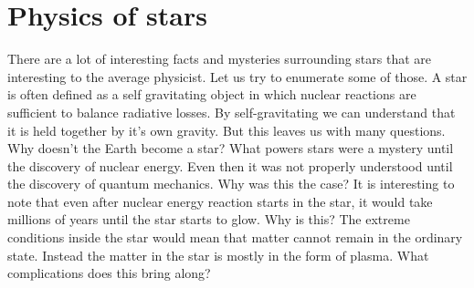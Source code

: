 \documentclass{../template/texnote}
\begin{document}
\section{Physics of stars}
There are a lot of interesting facts and mysteries surrounding stars that are interesting to the average physicist.
Let us try to enumerate some of those.
A star is often defined as a self gravitating object in which nuclear reactions are sufficient to balance radiative losses.
By self-gravitating we can understand that it is held together by it's own gravity.
But this leaves us with many questions. Why doesn't the Earth become a star?
What powers stars were a mystery until the discovery of nuclear energy.
Even then it was not properly understood until the discovery of quantum mechanics.
Why was this the case?
It is interesting to note that even after nuclear energy reaction starts in the star, it would take millions of years until the star starts to glow.%
Why is this?
The extreme conditions inside the star would mean that matter cannot remain in the ordinary state.
Instead the matter in the star is mostly in the form of plasma.
What complications does this bring along?
\end{document}
